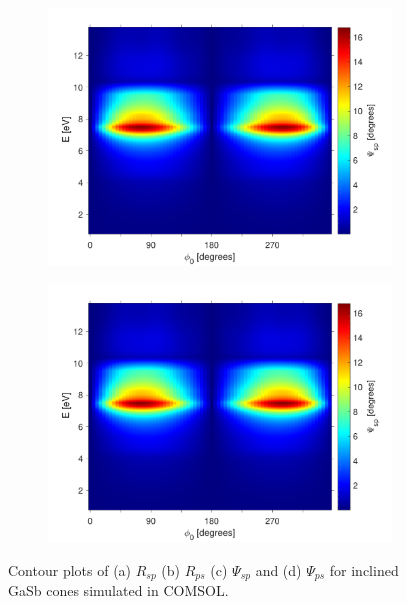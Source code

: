 \begin{figure}
    \begin{subfigure}{0.49\textwidth}
        \centering
        \includegraphics[width=\linewidth]{figures/ch4/gasb/contour/GaSbcones_Psisp.pdf}
    \end{subfigure}
    \begin{subfigure}{0.49\textwidth}
        \centering
        \includegraphics[width=\linewidth]{figures/ch4/gasb/contour/GaSbcones_Psisp.pdf}
    \end{subfigure}
    \caption{Contour plots of (a) $R_{sp}$ (b) $R_{ps}$ (c) $\Psi_{sp}$ and (d) $\Psi_{ps}$ for inclined GaSb cones simulated in COMSOL.}
    \label{fig:gasb_contour_Psisp_Psips}
\end{figure} 




